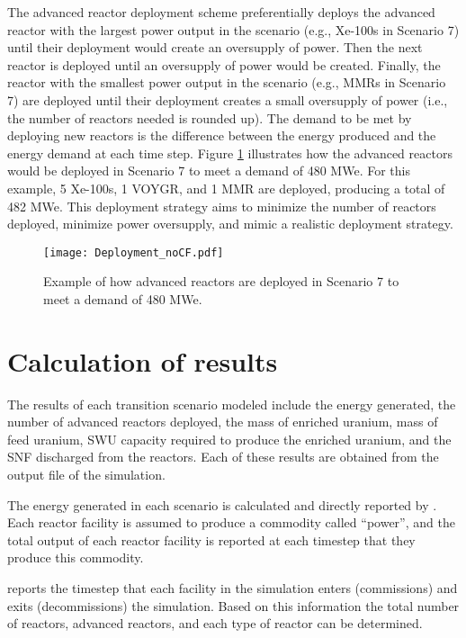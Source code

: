 The advanced reactor deployment scheme
preferentially deploys the advanced reactor with the largest power 
output in the scenario (e.g., Xe-100s in Scenario 7) until their 
deployment would create an oversupply of power. Then the next reactor 
is deployed until an oversupply of power would be created. Finally, the 
reactor 
with the smallest power output in the scenario (e.g., \glspl{MMR} in 
Scenario 7) are deployed until their deployment creates a small oversupply 
of power (i.e., the number of reactors needed is rounded up). The demand 
to be met by deploying new reactors is the difference between the energy 
produced and the energy demand at each time step. 
Figure \ref{fig:AR_deployment} illustrates how the advanced reactors 
would be deployed in Scenario 7 to meet a demand of 480 MWe. For this 
example, 5 Xe-100s, 1 VOYGR, and 1 \gls{MMR} are deployed, producing a 
total of 482 MWe. This deployment 
strategy aims to minimize the number of reactors deployed,  
minimize power oversupply, and mimic a realistic deployment strategy.

\begin{figure}[ht]
    \centering
    \texttt{[image: Deployment\_noCF.pdf]}
    \caption{Example of how advanced reactors are deployed in Scenario 7 
    to meet a demand of 480 MWe.}
    \label{fig:AR_deployment}
\end{figure}
 

\section{Calculation of results} \label{sec:results_calc}
The results of each transition scenario modeled include the energy generated, 
the number of advanced reactors deployed, the mass of enriched uranium, 
mass of feed uranium, \gls{SWU} capacity required to produce the enriched 
uranium, and the \gls{SNF} discharged from the reactors. Each of these results 
are obtained from the \Cyclus output file of the simulation. 

The energy generated in each scenario is calculated and directly 
reported by \Cyclus. Each reactor facility is assumed to produce a 
commodity called ``power'', and the total output of each reactor facility 
is reported at each timestep that they produce this commodity. 

\Cyclus reports the timestep that each facility in the simulation enters 
(commissions) and exits (decommissions) the simulation. Based on 
this information the total number of reactors, advanced reactors, and 
each type of reactor can be determined. 

